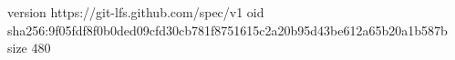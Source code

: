 version https://git-lfs.github.com/spec/v1
oid sha256:9f05fdf8f0b0ded09cfd30cb781f8751615c2a20b95d43be612a65b20a1b587b
size 480
